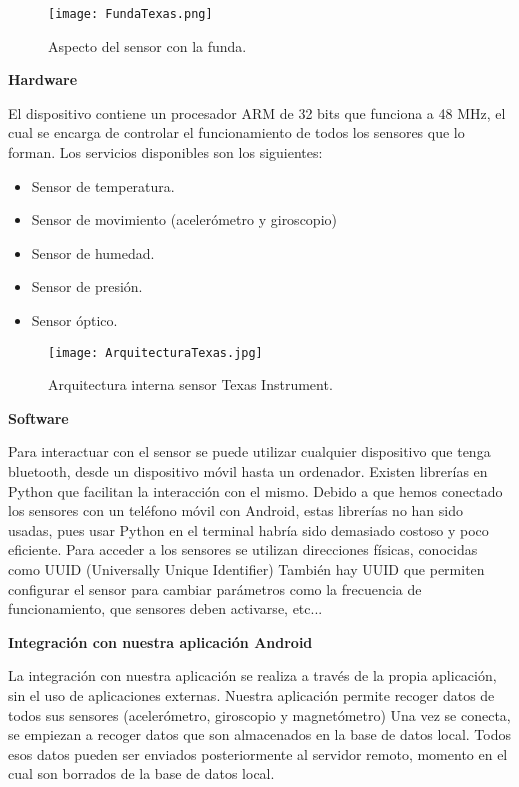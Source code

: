 \documentclass[11pt,spanish]{article}
\begin{document}
\begin{figure}[h!]
  \centering
  \texttt{[image: FundaTexas.png]}
  \caption{Aspecto del sensor con la funda.}
\end{figure}
\newpage

{\bf Hardware}
\newline

El dispositivo contiene un procesador ARM de 32 bits que funciona a 48 MHz, el cual se encarga de controlar el funcionamiento de todos los sensores que lo forman. Los servicios disponibles son los siguientes:

\begin{itemize}
  \item Sensor de temperatura.
  \item Sensor de movimiento (acelerómetro y giroscopio)
  \item Sensor de humedad.
  \item Sensor de presión.
  \item Sensor óptico.
\end{itemize}

\begin{figure}[h!]
  \centering
  \texttt{[image: ArquitecturaTexas.jpg]}
  \caption{Arquitectura interna sensor Texas Instrument.}
\end{figure}
\newpage

{\bf Software}
\newline

Para interactuar con el sensor se puede utilizar cualquier dispositivo que tenga bluetooth, desde un dispositivo móvil hasta un ordenador. Existen librerías en Python que facilitan la interacción con el mismo. Debido a que hemos conectado los sensores con un teléfono móvil con Android, estas librerías no han sido usadas, pues usar Python en el terminal habría sido demasiado costoso y poco eficiente. Para acceder a los sensores se utilizan direcciones físicas, conocidas como UUID (Universally Unique Identifier) También hay UUID que permiten configurar el sensor para cambiar parámetros como la frecuencia de funcionamiento, que sensores deben activarse, etc...
\newline

{\bf Integración con nuestra aplicación Android}
\newline

La integración con nuestra aplicación se realiza a través de la propia aplicación, sin el uso de aplicaciones externas. Nuestra aplicación permite recoger datos de todos sus sensores (acelerómetro, giroscopio y magnetómetro) Una vez se conecta, se empiezan a recoger datos que son almacenados en la base de datos local. Todos esos datos pueden ser enviados posteriormente al servidor remoto, momento en el cual son borrados de la base de datos local.
\end{document}
